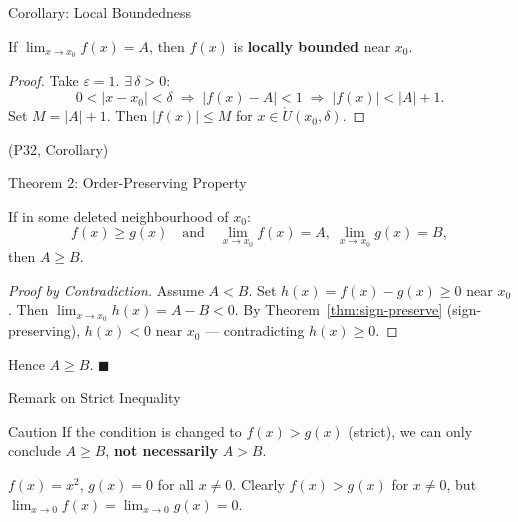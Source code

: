 \documentclass[aspectratio=169,10pt]{beamer}
\begin{document}
\begin{frame}{Corollary: Local Boundedness}
  \begin{corollary}
    If $\displaystyle\lim_{x\to x_0}f(x)=A$, then $f(x)$ is
    \textbf{locally bounded} near $x_0$.
  \end{corollary}
  \pause
  \begin{proof}
    Take $\varepsilon = 1$. $\exists\,\delta>0$:
    \[
      0<|x-x_0|<\delta \;\Longrightarrow\; |f(x)-A|<1
      \;\Longrightarrow\; |f(x)|<|A|+1.
    \]
    Set $M=|A|+1$. Then $|f(x)|\leq M$ for $x\in\mathring{U}(x_0,\delta)$.
  \end{proof}
  \hfill(P32, Corollary)
\end{frame}

\begin{frame}{Theorem 2: Order-Preserving Property}
  \begin{theorem}
    If in some deleted neighbourhood of $x_0$:
    \[
      f(x) \geq g(x) \quad\text{and}\quad
      \lim_{x\to x_0}f(x)=A,\; \lim_{x\to x_0}g(x)=B,
    \]
    then $A \geq B$.
  \end{theorem}
  \pause
  \begin{proof}[Proof by Contradiction]
    Assume $A < B$. Set $h(x)=f(x)-g(x)\geq 0$ near $x_0$.
    \pause
    Then $\displaystyle\lim_{x\to x_0}h(x)=A-B<0$.
    \pause
    By Theorem~\ref{thm:sign-preserve} (sign-preserving), $h(x)<0$ near $x_0$ ---
    contradicting $h(x)\geq 0$.
  \end{proof}
  \pause
  \begin{center}
    Hence $A \geq B$. \hfill$\blacksquare$
  \end{center}
\end{frame}

\begin{frame}{Remark on Strict Inequality}
  \begin{alertblock}{Caution}
    If the condition is changed to $f(x) > g(x)$ (strict), we can only conclude
    $A \geq B$, \textbf{not necessarily} $A > B$.
  \end{alertblock}
  \pause
    \begin{example}[Counterexample]
      $f(x)=x^2$, $g(x)=0$ for all $x\neq 0$.
      Clearly $f(x)>g(x)$ for $x\neq 0$, but
      $\displaystyle\lim_{x\to 0}f(x)=\lim_{x\to 0}g(x)=0$.
    \end{example}
\end{frame}
\end{document}
